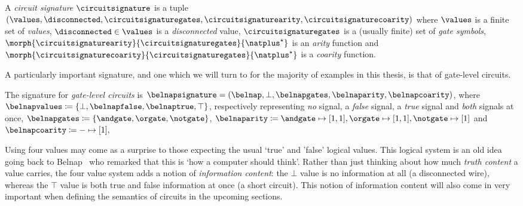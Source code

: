 \begin{definition}
    A \emph{circuit signature} \(\circuitsignature\) is a tuple \((
        \values,
        \disconnected,
        \circuitsignaturegates,
        \circuitsignaturearity,
        \circuitsignaturecoarity
    )\) where \(\values\) is a finite set of \emph{values}, \(
        \disconnected \in \values
    \) is a \emph{disconnected} value, \(\circuitsignaturegates\) is a (usually
    finite) set of \emph{gate symbols}, \(
        \morph{\circuitsignaturearity}{\circuitsignaturegates}{\natplus^\star}
    \) is an \emph{arity} function and \(
        \morph{\circuitsignaturecoarity}{\circuitsignaturegates}{\natplus^\star}
    \) is a \emph{coarity} function.
\end{definition}

A particularly important signature, and one which we will turn to for the
majority of examples in this thesis, is that of gate-level circuits.

\begin{example}\label{ex:sig}
    The signature for \emph{gate-level circuits} is \(
        \belnapsignature = (
            \belnap,
            \bot,
            \belnapgates,
            \belnaparity,
            \belnapcoarity
    )\), where \(
        \belnapvalues \coloneqq \{\bot, \belnapfalse, \belnaptrue, \top\}
    \), respectively representing \emph{no} signal, a \emph{false} signal, a
        \emph{true} signal and \emph{both} signals at once, \(
        \belnapgates \coloneqq \{\andgate,\orgate,\notgate\}
    \), \(
        \belnaparity \coloneqq
            \andgate \mapsto [1,1],
            \orgate \mapsto [1,1],
            \notgate \mapsto [1]
    \) and \(
        \belnapcoarity \coloneqq - \mapsto [1],
    \)
\end{example}

\begin{remark}
    Using four values may come as a surprise to those expecting the usual
    `true' and 'false' logical values.
    This logical system is an old idea going back to
    Belnap~\cite{belnap1977useful} who remarked that this is `how a computer
    should think'.
    Rather than just thinking about how much \emph{truth content} a value
    carries, the four value system adds a notion of \emph{information content}:
    the \(\bot\) value is no information at all (a disconnected wire), whereas
    the \(\top\) value is both true and false information at once
    (a short circuit).
    This notion of information content will also come in very important when
    defining the semantics of circuits in the upcoming sections.
\end{remark}

